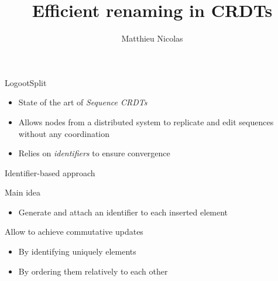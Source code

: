 \documentclass[10pt]{beamer}
\author{
  Matthieu Nicolas
}
\title{Efficient renaming in \acp{CRDT}}
\institute{}
\begin{document}
\begin{frame}[t,plain]
  \maketitle
\end{frame}

\begin{frame}{LogootSplit\cite{AndreCollaborateCom2013}}
  \begin{itemize}
    \item State of the art of \emph{Sequence \acfp{CRDT}}\cite{shapiro_2011_crdt}
    \item Allows nodes from a distributed system to replicate and edit sequences without any coordination
    \bigskip
    \item Relies on \emph{identifiers} to ensure convergence
  \end{itemize}
\end{frame}

\begin{frame}{Identifier-based approach}
  \begin{block}{Main idea}
    \begin{itemize}
      \item Generate and attach an identifier to each inserted element
    \end{itemize}
  \end{block}

  \bigskip

  \begin{block}{Allow to achieve commutative updates}
    \begin{itemize}
      \item By identifying uniquely elements
      \item By ordering them relatively to each other
    \end{itemize}
  \end{block}
\end{frame}
\end{document}
